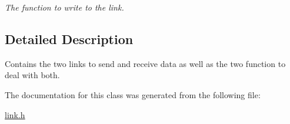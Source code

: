 \begin{DoxyCompactItemize}
\begin{DoxyCompactList}\small\item\em The function to write to the link. \end{DoxyCompactList}\end{DoxyCompactItemize}


\subsection{Detailed Description}
Contains the two links to send and receive data as well as the two function to deal with both. 

The documentation for this class was generated from the following file\-:\begin{DoxyCompactItemize}
\item 
\hyperlink{link_8h}{link.\-h}\end{DoxyCompactItemize}
